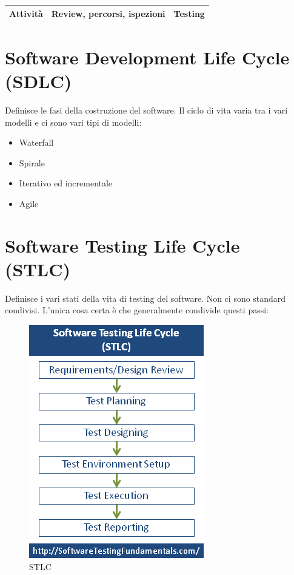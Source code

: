 \documentclass[11pt,a4paper]{book}
\begin{document}
\begin{table}[]
\begin{tabular}{|c|l|l|}
\textbf{Attività}                                                            & Review, percorsi, ispezioni                                                                                                                                                                                                    & Testing                                                                                                                                                                                                                                                                       \\ \hline
\end{tabular}
\end{table}

\section{Software Development Life Cycle (SDLC)}
Definisce le fasi della costruzione del software. Il ciclo di vita varia tra i vari modelli e ci sono vari tipi di modelli:
\begin{itemize}
	\item Waterfall
	\item Spirale
	\item Iterativo ed incrementale
	\item Agile
\end{itemize}

\section{Software Testing Life Cycle (STLC)}
Definisce i vari stati della vita di testing del software. Non ci sono standard condivisi. L'unica cosa certa è che generalmente condivide questi passi:
\begin{figure}[h!]
	\begin{center}
		\includegraphics[scale=0.6]{img/004.png}
		\caption{STLC}
		\label{fig: 004}
	\end{center}
\end{figure}
\end{document}
